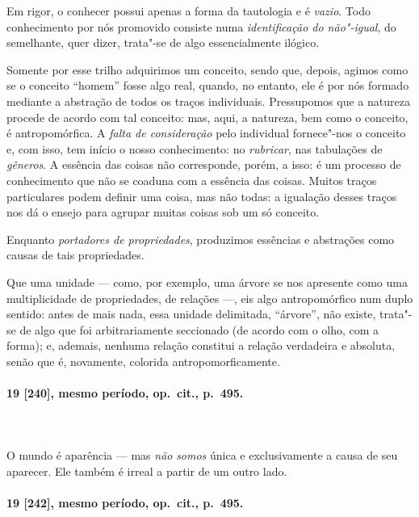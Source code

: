 Em rigor, o conhecer possui apenas a forma da tautologia e é
\textit{vazio}. Todo conhecimento por nós promovido consiste numa
\textit{identificação do não"-igual}, do semelhante, quer dizer,
trata"-se de algo essencialmente ilógico. 

Somente por esse trilho adquirimos um conceito, sendo que, depois,
agimos como se o conceito “homem” fosse algo real, quando, no entanto,
ele é por nós formado mediante a abstração de todos os traços
individuais. Pressupomos que a natureza procede de acordo com tal
conceito: mas, aqui, a natureza, bem como o conceito, é antropomórfica.
A \textit{falta de consideração} pelo individual fornece"-nos o
conceito e, com isso, tem início o nosso conhecimento: no
\textit{rubricar}, nas tabulações de \textit{gêneros}. A essência das
coisas não corresponde, porém, a isso: é um processo de conhecimento
que não se coaduna com a essência das coisas. Muitos traços
particulares podem definir uma coisa, mas não todas: a igualação
desses traços nos dá o ensejo para agrupar muitas coisas sob um só
conceito.

Enquanto \textit{portadores de propriedades}, produzimos essências e
abstrações como causas de tais propriedades.

Que uma unidade --- como, por exemplo, uma árvore se nos apresente
como uma multiplicidade de propriedades, de relações ---, eis algo
antropomórfico num duplo sentido: antes de mais nada, essa unidade
delimitada, “árvore”, não existe, trata"-se de algo que foi
arbitrariamente seccionado (de acordo com o olho, com a forma); e,
ademais, nenhuma relação constitui a relação verdadeira e absoluta,
senão que é, novamente, colorida antropomorficamente. 

\pagebreak
\paragraph*{19 [240], mesmo período, op.~cit., p.~495.}
\ \\
 \ \\

O mundo é aparência --- mas \textit{não} \textit{somos} única e
exclusivamente a causa de seu aparecer. Ele também é irreal a partir de
um outro lado.

\pagebreak
\paragraph*{19 [242], mesmo período, op.~cit., p.~495.}
\ \\
\ \\

